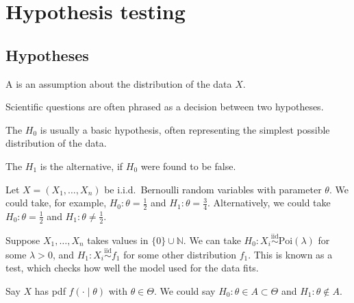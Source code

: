 \section{Hypothesis testing}

\subsection{Hypotheses}
\begin{definition}[Hypothesis]
	A  is an assumption about the distribution of the data $X$.
\end{definition}

Scientific questions are often phrased as a decision between two hypotheses.

\begin{definition}
	The  $H_0$ is usually a basic hypothesis, often representing the simplest possible distribution of the data.
\end{definition} 

\begin{definition}
	The  $H_1$ is the alternative, if $H_0$ were found to be false.
\end{definition} 

\begin{example}
	Let $X = (X_1, \dots, X_n)$ be i.i.d.\ Bernoulli random variables with parameter $\theta$.
	We could take, for example, $H_0 \colon \theta = \frac{1}{2}$ and $H_1 \colon \theta = \frac{3}{4}$.
	Alternatively, we could take $H_0 \colon \theta = \frac{1}{2}$ and $H_1 \colon \theta \neq \frac{1}{2}$.
\end{example}

\begin{example}
	Suppose $X_1, \dots, X_n$ takes values in $\{0\} \cup \mathbb{N}$.
	We can take $H_0 \colon X_i \overset{\mathrm{iid}}{\sim} \mathrm{Poi}(\lambda)$ for some $\lambda > 0$, and $H_1 \colon X_i \overset{\mathrm{iid}}{\sim} f_1$ for some other distribution $f_1$.
	This is known as a  test, which checks how well the model used for the data fits.
\end{example}

\begin{example}
	Say $X$ has pdf $f(\cdot \mid \theta)$ with $\theta \in \Theta$.
	We could say $H_0 : \theta \in A \subset \Theta$ and $H_1 : \theta \notin A$.
\end{example} 

